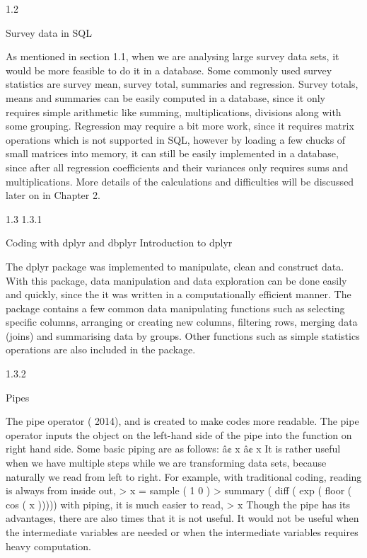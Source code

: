 1.2

Survey data in SQL

As mentioned in section 1.1, when we are analysing large survey data sets, it would
be more feasible to do it in a database. Some commonly used survey statistics are
survey mean, survey total, summaries and regression.
Survey totals, means and summaries can be easily computed in a database, since
it only requires simple arithmetic like summing, multiplications, divisions along
with some grouping.
Regression may require a bit more work, since it requires matrix operations
which is not supported in SQL, however by loading a few chucks of small matrices
into memory, it can still be easily implemented in a database, since after all regression coefficients and their variances only requires sums and multiplications.
More details of the calculations and difficulties will be discussed later on in
Chapter 2.

1.3
1.3.1

Coding with dplyr and dbplyr
Introduction to dplyr

The dplyr package was implemented to manipulate, clean and construct data. With
this package, data manipulation and data exploration can be done easily and quickly,
since the it was written in a computationally efficient manner.
The package contains a few common data manipulating functions such as selecting specific columns, arranging or creating new columns, filtering rows, merging
data (joins) and summarising data by groups. Other functions such as simple statistics operations are also included in the package.

1.3.2

Pipes

The pipe operator (%
2014), and is created to make codes more readable. The pipe operator inputs the
object on the left-hand side of the pipe into the function on right hand side. Some
basic piping are as follows:
â¢ x %
â¢ x %
It is rather useful when we have multiple steps while we are transforming data sets,
because naturally we read from left to right. For example, with traditional coding,
reading is always from inside out,
> x = sample ( 1 0 )
> summary ( diff ( exp ( floor ( cos ( x )))))
with piping, it is much easier to read,
> x %
Though the pipe has its advantages, there are also times that it is not useful. It would
not be useful when the intermediate variables are needed or when the intermediate
variables requires heavy computation.

